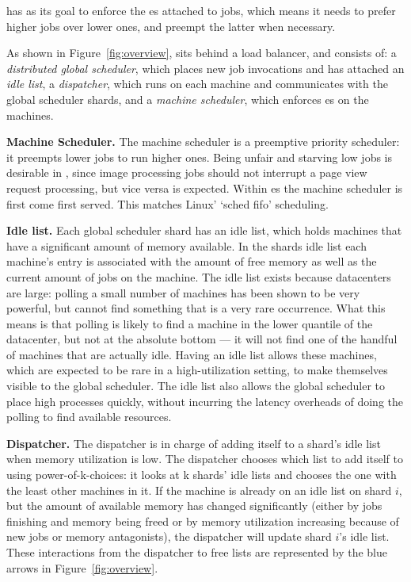 \Sys{} has as its goal to enforce the \class{}es attached to jobs, which means
it needs to prefer higher \class{} jobs over lower ones, and preempt the latter
when necessary.
  

As shown in Figure~\ref{fig:overview}, \sys{} sits behind a load balancer, and
consists of: a \textit{distributed global scheduler}, which places new job
invocations and has attached an \textit{idle list}, a \textit{dispatcher},
which runs on each machine and communicates with the global scheduler shards,
and a \textit{machine scheduler}, which enforces \class{}es on the machines.


\textbf{Machine Scheduler.}
The machine scheduler is a preemptive priority scheduler: it preempts lower
\class{} jobs to run higher \class{} ones. Being unfair and starving low
\class{} jobs is desirable in \sys{}, since image processing jobs should not
interrupt a page view request processing, but vice versa is expected. Within
\class{}es the machine scheduler is first come first served. This matches Linux'
`sched fifo' scheduling.


\textbf{Idle list.}
Each global scheduler shard has an idle list, which holds machines that
have a significant amount of memory available. In the shards idle list each
machine's entry is associated with the amount of free memory as well as the
current amount of jobs on the machine. The idle list exists because datacenters
are large: polling a small number of machines has been shown to be very
powerful, but cannot find something that is a very rare occurrence.
What this means is that polling is likely to find a machine in the lower
quantile of the datacenter, but not at the absolute bottom --- it will not find
one of the handful of machines that are actually idle. Having an idle list
allows these machines, which are expected to be rare in a high-utilization
setting, to make themselves visible to the global scheduler. The idle list also
allows the global scheduler to place high \class{} processes quickly, without
incurring the latency overheads of doing the polling to find available
resources.


\textbf{Dispatcher.}
The dispatcher is in charge of adding itself to a shard's idle list when memory
utilization is low. The dispatcher chooses which list to add itself to using
power-of-k-choices: it looks at k shards' idle lists and chooses the one with
the least other machines in it. If the machine is already on an idle list on
shard $i$, but the amount of available memory has changed significantly (either
by jobs finishing and memory being freed or by memory utilization increasing
because of new jobs or memory antagonists), the dispatcher will update shard
$i$'s idle list. These interactions from the dispatcher to free lists are
represented by the blue arrows in Figure~\ref{fig:overview}.

